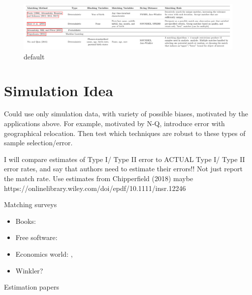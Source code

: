 \documentclass[12pt]{article}
\begin{document}
\begin{figure}[htbp]
\begin{center}
\includegraphics[width=\textwidth]{methods_table.pdf}
\caption{default}
\label{default}
\end{center}
\end{figure}

\section*{Simulation Idea}
Could use only simulation data, with variety of possible biases, motivated by the applications above.  For example, motivated by  N-Q, introduce error with geographical relocation.  Then test which techniques are robust to these types of sample selection/error.   

I will compare estimates of Type I/ Type II error to ACTUAL Type I/ Type II error rates, and say that authors need to estimate their errors!! Not just report the match rate.   Use estimates from Chipperfield (2018) maybe https://onlinelibrary.wiley.com/doi/epdf/10.1111/insr.12246

\newpage

Matching surveys
\begin{itemize}
\item Books: \cite{christen2012, herzog07}
\item Free software: \cite{kopcke2010}
\item Economics world: \cite{bailey2017}, \cite{abe2019} 
\item Winkler? 
\end{itemize}

Estimation papers
\begin{itemize}
\end{itemize}

 

\end{document}
